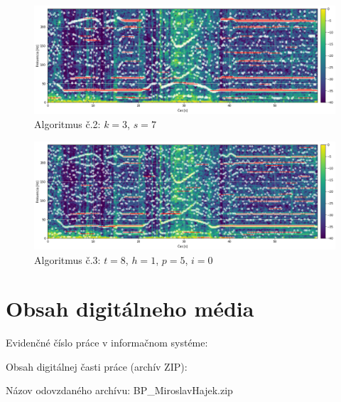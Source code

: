 \begin{figure}[h]
	\centering
    \includegraphics[width=\textwidth]{figures/verification/L35-dataset-A2.png}
    \caption{Algoritmus č.2: $k = 3$, $s = 7$}
\end{figure}

\begin{figure}[h]
	\centering
    \includegraphics[width=\textwidth]{figures/verification/L35-dataset-A3.png}
    \caption{Algoritmus č.3: $t = 8$, $h = 1$, $p = 5$, $i = 0$}
\end{figure}

\clearpage


\thispagestyle{empty}
\setcounter{figure}{0}
\chapter{Obsah digitálneho média}
\renewcommand*{\thepage}{E-\arabic{page}}
\par Evidenčné číslo práce v informačnom systéme: \RegNo
\par Obsah digitálnej časti práce (archív ZIP):
\par Názov odovzdaného archívu: BP\_MiroslavHajek.zip


